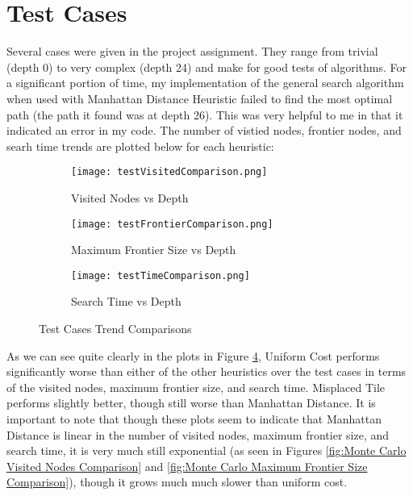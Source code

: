 \documentclass{article}
\begin{document}
\section{Test Cases}
Several cases were given in the project assignment. They range from trivial (depth 0) to very complex (depth 24) and make for good tests of algorithms. For a significant portion of time, my implementation of the general search algorithm when used with Manhattan Distance Heuristic failed to find the most optimal path (the path it found was at depth 26). This was very helpful to me in that it indicated an error in my code. The number of vistied nodes, frontier nodes, and searh time trends are plotted below for each heuristic:
\begin{figure}[ht]
	\centering
	\begin{subfigure}[b]{0.32\textwidth}
		\centering
		\texttt{[image: testVisitedComparison.png]}
		\caption{Visited Nodes vs Depth}
		\label{fig:Test Visited Nodes Comparison}
	\end{subfigure}
	\hfill
	\begin{subfigure}[b]{0.32\textwidth}
		\centering
		\texttt{[image: testFrontierComparison.png]}
		\caption{Maximum Frontier Size vs Depth}
		\label{fig:Test Maximum Frontier Size Comparison}
	\end{subfigure}
	\hfill
	\begin{subfigure}[b]{0.32\textwidth}
		\centering
		\texttt{[image: testTimeComparison.png]}
		\caption{Search Time vs Depth}
		\label{fig:Test Search Time Comparison}
	\end{subfigure}
	\caption{Test Cases Trend Comparisons}
	\label{fig:Test Cases Trend Comparisons}
\end{figure}
\par As we can see quite clearly in the plots in Figure \ref{fig:Test Cases Trend Comparisons}, Uniform Cost performs significantly worse than either of the other heuristics over the test cases in terms of the visited nodes, maximum frontier size, and search time. Misplaced Tile performs slightly better, though still worse than Manhattan Distance. It is important to note that though these plots seem to indicate that Manhattan Distance is linear in the number of visited nodes, maximum frontier size, and search time, it is very much still exponential (as seen in Figures \ref{fig:Monte Carlo Visited Nodes Comparison} and \ref{fig:Monte Carlo Maximum Frontier Size Comparison}), though it grows much much slower than uniform cost.
\end{document}
